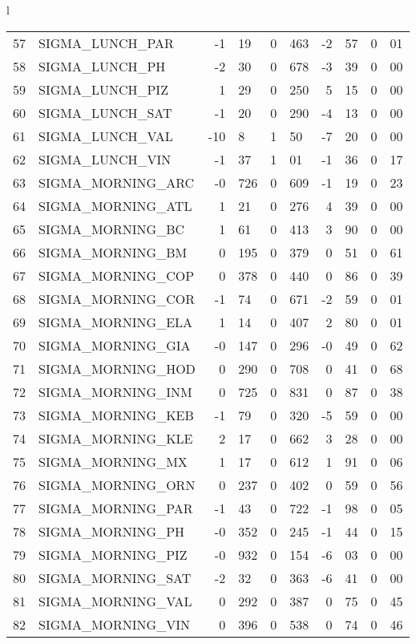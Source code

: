 \begin{tabular}{l}
\begin{tabular}{rlr@{.}lr@{.}lr@{.}lr@{.}l}
57 & SIGMA_LUNCH_PAR  & -1&19 & 0&463 & -2&57 & 0&01\\
58 & SIGMA_LUNCH_PH  & -2&30 & 0&678 & -3&39 & 0&00\\
59 & SIGMA_LUNCH_PIZ  & 1&29 & 0&250 & 5&15 & 0&00\\
60 & SIGMA_LUNCH_SAT  & -1&20 & 0&290 & -4&13 & 0&00\\
61 & SIGMA_LUNCH_VAL  & -10&8 & 1&50 & -7&20 & 0&00\\
62 & SIGMA_LUNCH_VIN & -1&37 & 1&01 & -1&36 & 0&17\\
63 & SIGMA_MORNING_ARC & -0&726 & 0&609 & -1&19 & 0&23\\
64 & SIGMA_MORNING_ATL  & 1&21 & 0&276 & 4&39 & 0&00\\
65 & SIGMA_MORNING_BC & 1&61 & 0&413 & 3&90 & 0&00\\
66 & SIGMA_MORNING_BM & 0&195 & 0&379 & 0&51 & 0&61\\
67 & SIGMA_MORNING_COP & 0&378 & 0&440 & 0&86 & 0&39\\
68 & SIGMA_MORNING_COR  & -1&74 & 0&671 & -2&59 & 0&01\\
69 & SIGMA_MORNING_ELA & 1&14 & 0&407 & 2&80 & 0&01\\
70 & SIGMA_MORNING_GIA  & -0&147 & 0&296 & -0&49 & 0&62\\
71 & SIGMA_MORNING_HOD  & 0&290 & 0&708 & 0&41 & 0&68\\
72 & SIGMA_MORNING_INM  & 0&725 & 0&831 & 0&87 & 0&38\\
73 & SIGMA_MORNING_KEB  & -1&79 & 0&320 & -5&59 & 0&00\\
74 & SIGMA_MORNING_KLE & 2&17 & 0&662 & 3&28 & 0&00\\
75 & SIGMA_MORNING_MX  & 1&17 & 0&612 & 1&91 & 0&06\\
76 & SIGMA_MORNING_ORN  & 0&237 & 0&402 & 0&59 & 0&56\\
77 & SIGMA_MORNING_PAR  & -1&43 & 0&722 & -1&98 & 0&05\\
78 & SIGMA_MORNING_PH  & -0&352 & 0&245 & -1&44 & 0&15\\
79 & SIGMA_MORNING_PIZ  & -0&932 & 0&154 & -6&03 & 0&00\\
80 & SIGMA_MORNING_SAT  & -2&32 & 0&363 & -6&41 & 0&00\\
81 & SIGMA_MORNING_VAL  & 0&292 & 0&387 & 0&75 & 0&45\\
82 & SIGMA_MORNING_VIN & 0&396 & 0&538 & 0&74 & 0&46\\
\hline
\end{tabular}
\\
\begin{tabular}{rcl}

\end{tabular}
\end{tabular}
